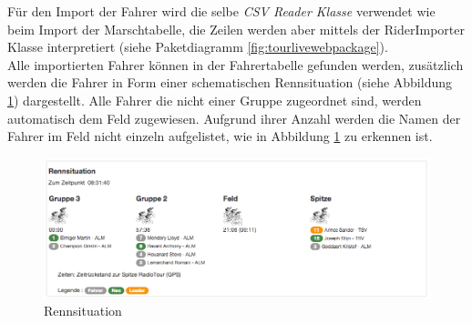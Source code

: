 Für den Import der Fahrer wird die selbe \textit{CSV Reader Klasse} verwendet wie beim Import der Marschtabelle, die Zeilen werden aber mittels der RiderImporter Klasse interpretiert (siehe Paketdiagramm \ref{fig:tourlivewebpackage}).
\\

Alle importierten Fahrer können in der Fahrertabelle gefunden werden, zusätzlich werden die Fahrer in Form einer schematischen Rennsituation (siehe Abbildung \ref{fig:rennsituationneu}) dargestellt. Alle Fahrer die nicht einer Gruppe zugeordnet sind, werden automatisch dem Feld zugewiesen. Aufgrund ihrer Anzahl werden die Namen der Fahrer im Feld nicht einzeln aufgelistet, wie in Abbildung \ref{fig:rennsituationneu} zu erkennen ist.

\begin{figure}[H]
	\centering
	\includegraphics[width=130mm]{images/tourliveweb/rennsituation_neu.png}
	\caption{Rennsituation}
	\label{fig:rennsituationneu}
\end{figure}